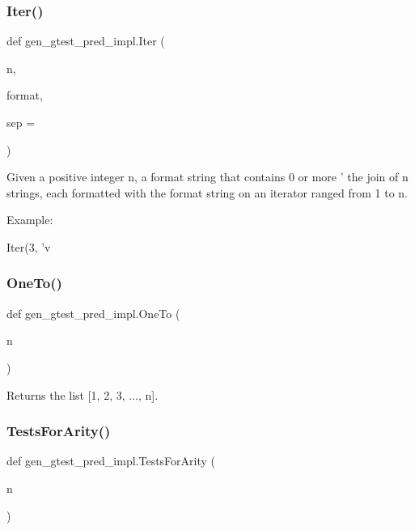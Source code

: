 \subsubsection{\texorpdfstring{Iter()}{Iter()}}
{\footnotesize\ttfamily def gen\+\_\+gtest\+\_\+pred\+\_\+impl.\+Iter (\begin{DoxyParamCaption}\item[{}]{n,  }\item[{}]{format,  }\item[{}]{sep = {\ttfamily \textquotesingle{}\textquotesingle{}} }\end{DoxyParamCaption})}

\begin{DoxyVerb}Given a positive integer n, a format string that contains 0 or
more '%
the join of n strings, each formatted with the format string on an
iterator ranged from 1 to n.

Example:

Iter(3, 'v%
\end{DoxyVerb}
 \mbox{\label{namespacegen__gtest__pred__impl_a7920598d51c9dded76a4ef9ffde339e4}} 
\subsubsection{\texorpdfstring{OneTo()}{OneTo()}}
{\footnotesize\ttfamily def gen\+\_\+gtest\+\_\+pred\+\_\+impl.\+One\+To (\begin{DoxyParamCaption}\item[{}]{n }\end{DoxyParamCaption})}

\begin{DoxyVerb}Returns the list [1, 2, 3, ..., n].\end{DoxyVerb}
 \mbox{\label{namespacegen__gtest__pred__impl_ab0da913fa15e5695d5bb2dd1de5dec57}} 
\subsubsection{\texorpdfstring{TestsForArity()}{TestsForArity()}}
{\footnotesize\ttfamily def gen\+\_\+gtest\+\_\+pred\+\_\+impl.\+Tests\+For\+Arity (\begin{DoxyParamCaption}\item[{}]{n }\end{DoxyParamCaption})}


